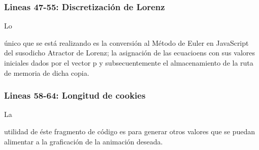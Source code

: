\documentclass[stu, 12pt, letterpaper, donotrepeattitle, floatsintext]{apa7}
\begin{document}
    \subsubsection*{Lineas 47-55: Discretización de Lorenz}
    Lo \begin{justifying}
      único que se está realizando es la conversión al Método de Euler en JavaScript del susodicho Atractor de Lorenz; la asignación de las ecuacioens con sus valores iniciales
    dados por el vector {\selectfont p} y subsecuentemente el almacenamiento de la ruta de memoria de dicha copia.\par
    \end{justifying}
    \vspace{\baselineskip}
    \subsubsection*{Lineas 58-64: Longitud de cookies}
    La \begin{justifying}
      utilidad de éste fragmento de código es para generar otros valores que se puedan alimentar
      a la graficación de la animación deseada.\par
    \end{justifying}
    \vspace{\baselineskip}
\end{document}
